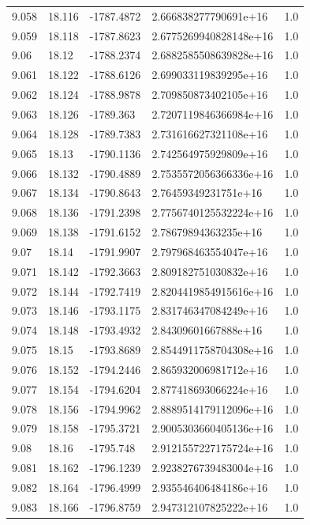\begin{tabular}{lllll}
9.058 & 18.116 & -1787.4872 & 2.666838277790691e+16 & 1.0 \\
9.059 & 18.118 & -1787.8623 & 2.6775269940828148e+16 & 1.0 \\
9.06 & 18.12 & -1788.2374 & 2.6882585508639828e+16 & 1.0 \\
9.061 & 18.122 & -1788.6126 & 2.699033119839295e+16 & 1.0 \\
9.062 & 18.124 & -1788.9878 & 2.709850873402105e+16 & 1.0 \\
9.063 & 18.126 & -1789.363 & 2.7207119846366984e+16 & 1.0 \\
9.064 & 18.128 & -1789.7383 & 2.731616627321108e+16 & 1.0 \\
9.065 & 18.13 & -1790.1136 & 2.742564975929809e+16 & 1.0 \\
9.066 & 18.132 & -1790.4889 & 2.7535572056366336e+16 & 1.0 \\
9.067 & 18.134 & -1790.8643 & 2.76459349231751e+16 & 1.0 \\
9.068 & 18.136 & -1791.2398 & 2.7756740125532224e+16 & 1.0 \\
9.069 & 18.138 & -1791.6152 & 2.78679894363235e+16 & 1.0 \\
9.07 & 18.14 & -1791.9907 & 2.797968463554047e+16 & 1.0 \\
9.071 & 18.142 & -1792.3663 & 2.809182751030832e+16 & 1.0 \\
9.072 & 18.144 & -1792.7419 & 2.8204419854915616e+16 & 1.0 \\
9.073 & 18.146 & -1793.1175 & 2.831746347084249e+16 & 1.0 \\
9.074 & 18.148 & -1793.4932 & 2.84309601667888e+16 & 1.0 \\
9.075 & 18.15 & -1793.8689 & 2.8544911758704308e+16 & 1.0 \\
9.076 & 18.152 & -1794.2446 & 2.865932006981712e+16 & 1.0 \\
9.077 & 18.154 & -1794.6204 & 2.877418693066224e+16 & 1.0 \\
9.078 & 18.156 & -1794.9962 & 2.8889514179112096e+16 & 1.0 \\
9.079 & 18.158 & -1795.3721 & 2.9005303660405136e+16 & 1.0 \\
9.08 & 18.16 & -1795.748 & 2.9121557227175724e+16 & 1.0 \\
9.081 & 18.162 & -1796.1239 & 2.9238276739483004e+16 & 1.0 \\
9.082 & 18.164 & -1796.4999 & 2.935546406484186e+16 & 1.0 \\
9.083 & 18.166 & -1796.8759 & 2.947312107825222e+16 & 1.0 \\

\end{tabular}
